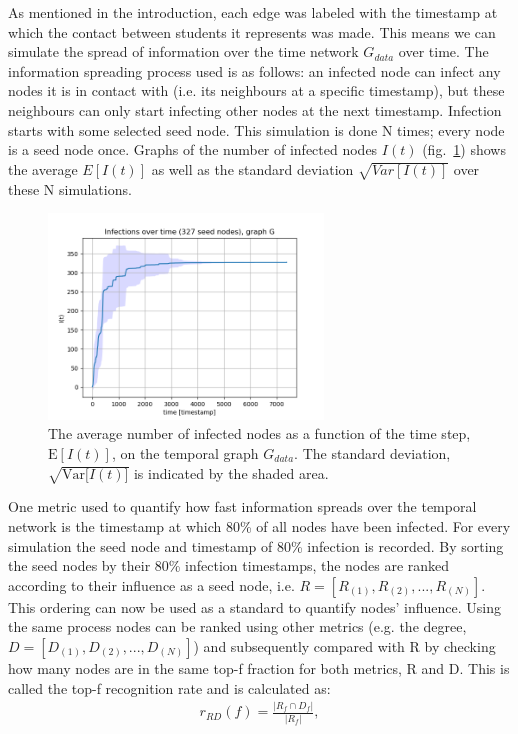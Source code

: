 \documentclass[letterpaper]{article}
\begin{document}
As mentioned in the introduction, each edge was labeled with the timestamp at which the contact between students it represents was made. This means we can simulate the spread of information over the time network \(G_{data}\) over time. 
The information spreading process used is as follows: an infected node can infect any nodes it is in contact with (i.e. its neighbours at a specific timestamp), but these neighbours can only start infecting other nodes at the next timestamp. Infection starts with some selected seed node. 
This simulation is done N times; every node is a seed node once. Graphs of the number of infected nodes \(I(t)\) (fig.~\ref{fig:infections_G}) shows the average \(E[I(t)]\) as well as the standard deviation \(\sqrt{Var[I(t)]}\) over these N simulations.
\begin{figure}[ht!]
  \centering
   \includegraphics[width=0.65\textwidth]{img/infections_G.png}
   \caption{\small{The average number of infected nodes as a function of the time step, $\mathrm{E}[I(t)]$, on the temporal graph $G_{data}$. The standard deviation, $\sqrt{\mathrm{Var}{[I(t)}]}$ is indicated by the shaded area.}}
   \label{fig:infections_G}
\end{figure}

One metric used to quantify how fast information spreads over the temporal network is the timestamp at which 80\% of all nodes have been infected. For every simulation the seed node and timestamp of 80\% infection is recorded. By sorting the seed nodes by their 80\% infection timestamps, the nodes are ranked according to their influence as a seed node, i.e. \(R=[R_{(1)}, R_{(2)}, ..., R_{(N)}]\). This ordering can now be used as a standard to quantify nodes' influence. Using the same process nodes can be ranked using other metrics (e.g. the degree, \(D=[D_{(1)}, D_{(2)}, ..., D_{(N)}]\)) and subsequently compared with R by checking how many nodes are in the same top-f fraction for both metrics, R and D. This is called the top-f recognition rate and is calculated as:
\begin{align*}
	r_{RD}(f) = \frac{\left|R_f \cap D_f\right|}{\left|R_f\right|},
\end{align*}
\end{document}
